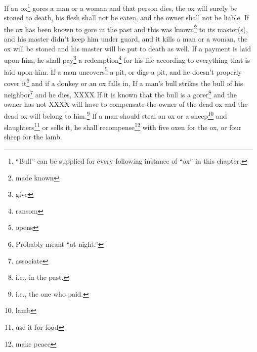 \begin{enumerate}[align=center]
     If an ox\footnote{``Bull'' can be supplied for every following instance of ``ox'' in this chapter.} gores a man or a woman and that person dies, the ox will surely be stoned to death, his flesh shall not be eaten, and the owner shall not be liable.%
     If the ox has been known to gore in the past and this was known\footnote{made known} to its master(s), and his master didn't keep him under guard, and it kills a man or a woman, the ox will be stoned and his master will be put to death as well.%
     If a payment is laid upon him, he shall pay\footnote{give} a redemption\footnote{ransom} for his life according to everything that is laid upon him.%
     If a man uncovers\footnote{opens} a pit, or digs a pit, and he doesn't properly cover it\footnote{Probably meant ``at night.''} and if a donkey or an ox falls in,%
     If a man's bull strikes the bull of his neighbor\footnote{associate} and he dies, XXXX%
     If it is known that the bull is a gorer\footnote{i.e., in the past.} and the owner has not XXXX will have to compensate the owner of the dead ox and the dead ox will belong to him.\footnote{i.e., the one who paid.}%
     If a man should steal an ox or a sheep\footnote{lamb} and slaughters\footnote{use it for food} or sells it, he shall recompense\footnote{make peace} with five oxen for the ox, or four sheep for the lamb.%
\end{enumerate}
